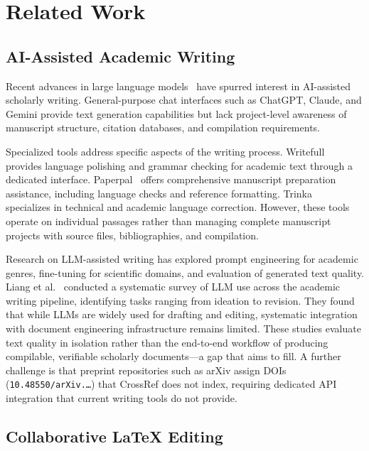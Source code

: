 \section{Related Work}
\label{sec:related}

\subsection{AI-Assisted Academic Writing}

Recent advances in large language models~\cite{openai2023gpt4,anthropic2024claude}
have spurred interest in AI-assisted scholarly writing. General-purpose chat
interfaces such as ChatGPT, Claude, and Gemini provide text generation
capabilities but lack project-level awareness of manuscript structure, citation
databases, and compilation requirements.

Specialized tools address specific aspects of the writing process.
Writefull~\cite{writefull} provides language polishing and grammar checking
for academic text through a dedicated interface. Paperpal~\cite{paperpal} offers
comprehensive manuscript preparation assistance, including language checks and
reference formatting. Trinka~\cite{trinka} specializes in technical and academic
language correction. However, these tools operate on individual passages rather
than managing complete manuscript projects with source files, bibliographies,
and compilation.

Research on LLM-assisted writing has explored prompt engineering for academic
genres, fine-tuning for scientific domains, and evaluation of generated text
quality. Liang et al.~\cite{liang2024llmwriting} conducted a systematic survey
of LLM use across the academic writing pipeline, identifying tasks ranging from
ideation to revision. They found that while LLMs are widely used for drafting
and editing, systematic integration with document engineering infrastructure
remains limited. These studies evaluate text quality
in isolation rather than the end-to-end workflow of producing compilable,
verifiable scholarly documents---a gap that \software{} aims to fill.
A further challenge is that preprint repositories such as arXiv assign DOIs
(\texttt{10.48550/arXiv.\ldots}) that CrossRef does not index, requiring
dedicated API integration that current writing tools do not provide.

\subsection{Collaborative \LaTeX{} Editing}

